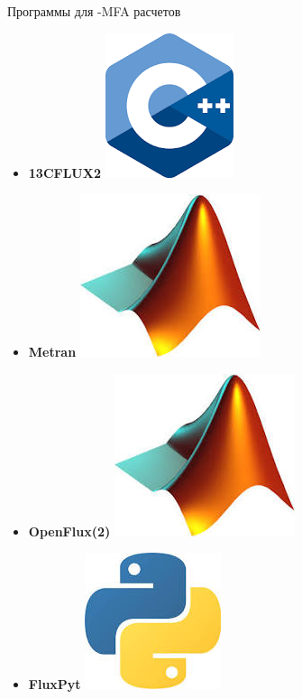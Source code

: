 \documentclass[aspectratio=169]{beamer}
\begin{document}
\begin{frame}{Программы для -MFA расчетов}
	\begin{itemize}
		\item \textbf{13CFLUX2}  \includegraphics[height=\fontcharht\font`\B]{c.png}
		
		\item \textbf{Metran} \includegraphics[height=\fontcharht\font`\B]{matlab.jpeg}
		
		\item \textbf{OpenFlux(2)} \includegraphics[height=\fontcharht\font`\B]{matlab.jpeg}
		
		\item \textbf{FluxPyt} \includegraphics[height=\fontcharht\font`\B]{python.jpeg}
		

\end{itemize}
\end{frame}
\end{document}
